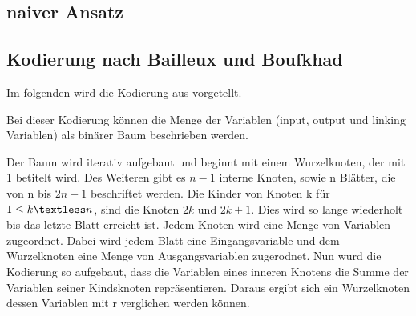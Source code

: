 \documentclass[a4,abstract=on]{scrartcl}
\begin{document}

	\subsection{naiver Ansatz}

	\subsection{Kodierung nach Bailleux und Boufkhad}
Im folgenden wird die Kodierung aus  \cite[][]{bailleux} vorgetellt.

Bei dieser Kodierung können die Menge der Variablen (input, output und linking Variablen) als binärer Baum beschrieben werden.

Der Baum wird iterativ aufgebaut und beginnt mit einem Wurzelknoten, der mit 1 betitelt wird. Des Weiteren gibt es $n-1$ interne Knoten, sowie n Blätter, die von n bis $2n-1$ beschriftet werden. Die Kinder von Knoten k  für $1 \leq k \textless n$, sind die Knoten $2k$ und $2k +1$. Dies wird so lange wiederholt bis das letzte Blatt erreicht ist.
Jedem Knoten wird eine Menge von Variablen zugeordnet. Dabei wird jedem Blatt eine Eingangsvariable und dem Wurzelknoten eine Menge von Ausgangsvariablen zugerodnet. Nun wurd die Kodierung so aufgebaut, dass die Variablen eines inneren Knotens die Summe der Variablen seiner Kindsknoten repräsentieren. Daraus ergibt sich ein Wurzelknoten dessen Variablen mit r verglichen werden können.\\
\end{document}
